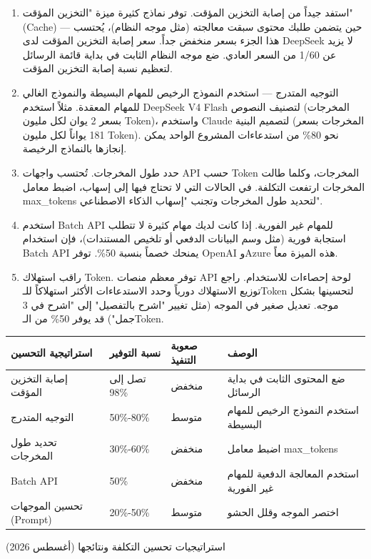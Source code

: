 \begin{enumerate}
  \item استفد جيداً من إصابة التخزين المؤقت. توفر نماذج كثيرة ميزة "التخزين المؤقت" (Cache) — حين يتضمن طلبك محتوى سبقت معالجته (مثل موجه النظام)، يُحتسب هذا الجزء بسعر منخفض جداً. سعر إصابة التخزين المؤقت لدى DeepSeek لا يزيد عن 1/60 من السعر العادي. ضع موجه النظام الثابت في بداية قائمة الرسائل لتعظيم نسبة إصابة التخزين المؤقت.
  \item التوجيه المتدرج — استخدم النموذج الرخيص للمهام البسيطة والنموذج الغالي للمهام المعقدة. مثلاً استخدم DeepSeek V4 Flash لتصنيف النصوص (المخرجات بسعر 2 يوان لكل مليون Token)، واستخدم Claude لتصميم البنية (المخرجات بسعر 181 يواناً لكل مليون Token). نحو 80\% من استدعاءات المشروع الواحد يمكن إنجازها بالنماذج الرخيصة.
  \item حدد طول المخرجات. تُحتسب واجهات API حسب Token المخرجات، وكلما طالت المخرجات ارتفعت التكلفة. في الحالات التي لا تحتاج فيها إلى إسهاب، اضبط معامل max\_tokens لتحديد طول المخرجات وتجنب "إسهاب الذكاء الاصطناعي".
  \item استخدم Batch API للمهام غير الفورية. إذا كانت لديك مهام كثيرة لا تتطلب استجابة فورية (مثل وسم البيانات الدفعي أو تلخيص المستندات)، فإن استخدام Batch API يمنحك خصماً بنسبة 50\%. توفر OpenAI وAzure هذه الميزة معاً.
  \item راقب استهلاك Token. توفر معظم منصات API لوحة إحصاءات للاستخدام. راجع توزيع الاستهلاك دورياً وحدد الاستدعاءات الأكثر استهلاكاً للـToken لتحسينها بشكل موجه. تعديل صغير في الموجه (مثل تغيير "اشرح بالتفصيل" إلى "اشرح في 3 جمل") قد يوفر 50\% من الـToken.
\end{enumerate}

\begin{center}
\begin{tabularx}{\linewidth}{|X|X|X|X|}
\hline
\textbf{استراتيجية التحسين} & \textbf{نسبة التوفير} & \textbf{صعوبة التنفيذ} & \textbf{الوصف} \tabularnewline
\hline
إصابة التخزين المؤقت & تصل إلى 98\% & منخفض & ضع المحتوى الثابت في بداية الرسائل \tabularnewline
التوجيه المتدرج & 50\%-80\% & متوسط & استخدم النموذج الرخيص للمهام البسيطة \tabularnewline
تحديد طول المخرجات & 30\%-60\% & منخفض & اضبط معامل max\_tokens \tabularnewline
Batch API & 50\% & منخفض & استخدم المعالجة الدفعية للمهام غير الفورية \tabularnewline
تحسين الموجهات (Prompt) & 20\%-50\% & متوسط & اختصر الموجه وقلل الحشو \tabularnewline
\hline
\end{tabularx}
\end{center}

\begin{center}\small\color{gray}استراتيجيات تحسين التكلفة ونتائجها (أغسطس 2026)\end{center}

